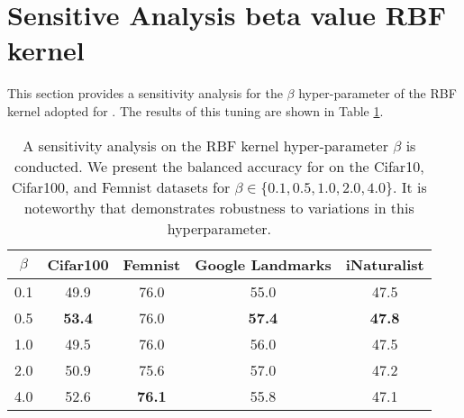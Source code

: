 \section{Sensitive Analysis beta value RBF kernel} \label{app:sensitive}

This section provides a sensitivity analysis for the $\beta$ hyper-parameter of the RBF kernel adopted for \shortname. The results of this tuning are shown in Table \ref{tab:sensitive}.

\begin{table}[h]

    \caption{\small{A sensitivity analysis on the RBF kernel hyper-parameter $\beta$ is conducted. We present the balanced accuracy for \shortname on the Cifar10, Cifar100, and Femnist datasets for $\beta \in \{0.1, 0.5, 1.0, 2.0, 4.0\}$. It is noteworthy that \shortname demonstrates robustness to variations in this hyperparameter.}}
    \label{tab:sensitive}
    \centering
    \begin{adjustbox}{width=.6\linewidth}
        \centering
        
        \begin{tabular}{ccccc}
            
            \toprule

            \textbf{$\beta$} & \textbf{Cifar100} & \textbf{Femnist} & \textbf{Google Landmarks} & \textbf{iNaturalist}\\
            
            \midrule

            0.1 &  49.9 & 76.0 & 55.0 &  47.5\\
            0.5  & \textbf{53.4} & 76.0 & \textbf{57.4} & \textbf{47.8}\\
            1.0  & 49.5 & 76.0 & 56.0 & 47.5\\
            2.0  & 50.9 & 75.6 & 57.0 & 47.2 \\
            4.0 & 52.6 & \textbf{76.1} & 55.8 & 47.1 \\
            
            \bottomrule
        
        \end{tabular}
    \end{adjustbox}
\end{table}

